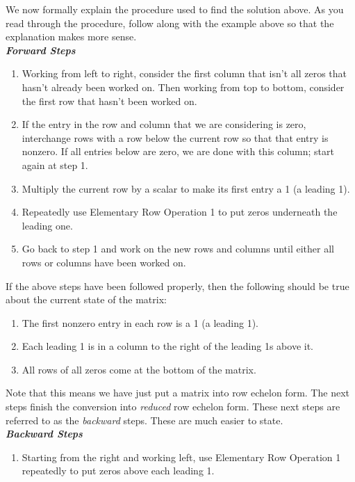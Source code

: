 \medskip

We now formally explain the procedure used to find the solution above. As you read through the procedure, follow along with the example above so that the explanation makes more sense.\\

\textbf{\em Forward Steps}
\begin{enumerate}
\item		Working from left to right, consider the first column that isn't all zeros that hasn't already been worked on. Then working from top to bottom, consider the first row that hasn't been worked on.
\item		If the entry in the row and column that we are considering is zero, interchange rows with a row below the current row so that that entry is nonzero. If all entries below are zero, we are done with this column; start again at step 1. 
\item		Multiply the current row by a scalar to make its first entry a 1 (a leading 1).
\item		Repeatedly use Elementary Row Operation 1 to put zeros underneath the leading one.
\item		Go back to step 1 and work on the new rows and columns until either all rows or columns have been worked on.
\end{enumerate}

If the above steps have been followed properly, then the following should be true about the current state of the matrix:

\begin{enumerate}
\item		The first nonzero entry in each row is a 1 (a leading 1).
\item		Each leading 1 is in a column to the right of the leading 1s above it.
\item		All rows of all zeros come at the bottom of the matrix.
\end{enumerate}

Note that this means we have just put a matrix into row echelon form. The next steps finish the conversion into \textit{reduced} row echelon form. These next steps are referred to as the \textit{backward} steps. These are much easier to state.\\

\textbf{\em Backward Steps}
\begin{enumerate}
\item		Starting from the right and working left, use Elementary Row Operation 1 repeatedly to put zeros above each leading 1.
\end{enumerate}

